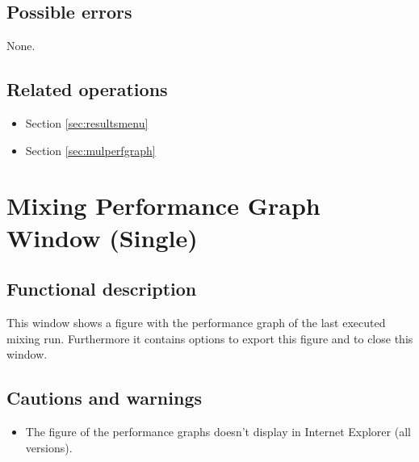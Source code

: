   \subsection*{Possible errors}
  None.

  \subsection*{Related operations}
   \begin{itemize}
   \item Section \ref{sec:resultsmenu}
   \item Section \ref{sec:mulperfgraph}
  \end{itemize}

\section{Mixing Performance Graph Window (Single)}
\label{sec:singperfgraph}
  \subsection*{Functional description}
  This window shows a figure with the performance graph of the last executed mixing run. Furthermore it contains options to export this figure and to close this window.

  \subsection*{Cautions and warnings}
  \begin{itemize}
  \item The figure of the performance graphs doesn't display in Internet Explorer (all versions).
  \end{itemize}

